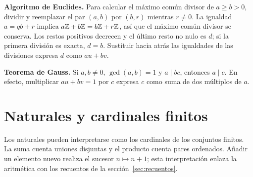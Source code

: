 \textbf{Algoritmo de Euclides.} Para calcular el máximo común divisor
de $a\ge b>0$, dividir y reemplazar el par $(a,b)$ por $(b,r)$ mientras
$r\ne0$. La igualdad $a=qb+r$ implica
$a\mathbb{Z}+b\mathbb{Z}=b\mathbb{Z}+r\mathbb{Z}$, así que el máximo común divisor se conserva.
Los restos positivos decrecen y el último resto no nulo es $d$;
si la primera división es exacta, $d=b$. Sustituir hacia atrás las
igualdades de las divisiones expresa $d$ como $au+bv$.

\textbf{Teorema de Gauss.} Si $a,b\ne0$, $\gcd(a,b)=1$ y $a\mid bc$,
entonces $a\mid c$. En efecto, multiplicar $au+bv=1$ por $c$ expresa
$c$ como suma de dos múltiplos de $a$.

\section{Naturales y cardinales finitos}
Los naturales pueden interpretarse como los cardinales de los conjuntos
finitos. La suma cuenta uniones disjuntas y el producto cuenta pares
ordenados. Añadir un elemento nuevo realiza el sucesor $n\mapsto n+1$;
esta interpretación enlaza la aritmética con los recuentos de la
sección~\ref{sec:recuentos}.
